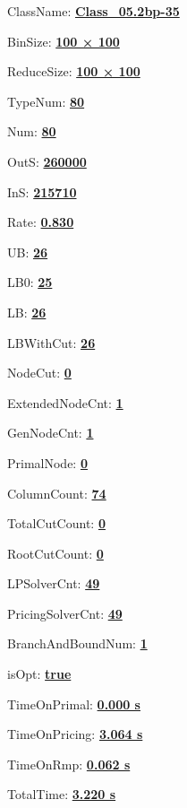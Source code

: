 \documentclass[11pt]{article}
\begin{document}
\pagestyle{empty}


ClassName: \underline{\textbf{Class_05.2bp-35}}
\par
BinSize: \underline{\textbf{100 × 100}}
\par
ReduceSize: \underline{\textbf{100 × 100}}
\par
TypeNum: \underline{\textbf{80}}
\par
Num: \underline{\textbf{80}}
\par
OutS: \underline{\textbf{260000}}
\par
InS: \underline{\textbf{215710}}
\par
Rate: \underline{\textbf{0.830}}
\par
UB: \underline{\textbf{26}}
\par
LB0: \underline{\textbf{25}}
\par
LB: \underline{\textbf{26}}
\par
LBWithCut: \underline{\textbf{26}}
\par
NodeCut: \underline{\textbf{0}}
\par
ExtendedNodeCnt: \underline{\textbf{1}}
\par
GenNodeCnt: \underline{\textbf{1}}
\par
PrimalNode: \underline{\textbf{0}}
\par
ColumnCount: \underline{\textbf{74}}
\par
TotalCutCount: \underline{\textbf{0}}
\par
RootCutCount: \underline{\textbf{0}}
\par
LPSolverCnt: \underline{\textbf{49}}
\par
PricingSolverCnt: \underline{\textbf{49}}
\par
BranchAndBoundNum: \underline{\textbf{1}}
\par
isOpt: \underline{\textbf{true}}
\par
TimeOnPrimal: \underline{\textbf{0.000 s}}
\par
TimeOnPricing: \underline{\textbf{3.064 s}}
\par
TimeOnRmp: \underline{\textbf{0.062 s}}
\par
TotalTime: \underline{\textbf{3.220 s}}
\par
\newpage


\end{document}
